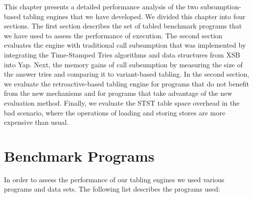 This chapter presents a detailed performance analysis of the two subsumption-based tabling engines
that we have developed. We divided this chapter into four sections. The first section describes the
set of tabled benchmark programs that we have used to assess the performance of execution. The second
section evaluates the engine with traditional call subsumption that was implemented by integrating the
Time-Stamped Tries algorithms and data structures from XSB into Yap. Next, the memory gains of call subsumption
by measuring the size of the answer tries and comparing it to variant-based tabling.
In the second section, we evaluate the retroactive-based tabling engine for programs that do not benefit
from the new mechanisms and
for programs that take advantage of the new evaluation method. Finally, we evaluate the STST table space
overhead in the bad scenario, where the operations of loading and storing stores are more expensive than
usual.

\section{Benchmark Programs}

In order to assess the performance of our tabling engines we used various programs and data sets.
The following list describes the programs used:


